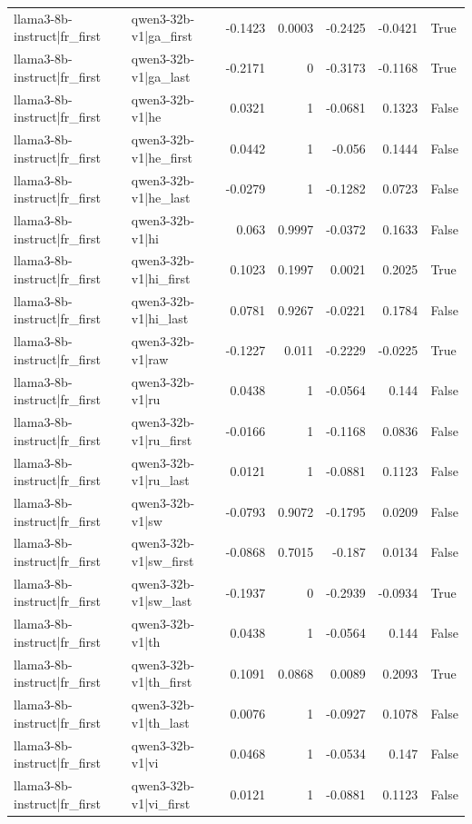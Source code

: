 \begin{table}
\begin{tabular}{l l r r r r l}
llama3-8b-instruct|fr_first & qwen3-32b-v1|ga_first & -0.1423 & 0.0003 & -0.2425 & -0.0421 & True \\
llama3-8b-instruct|fr_first & qwen3-32b-v1|ga_last & -0.2171 & 0 & -0.3173 & -0.1168 & True \\
llama3-8b-instruct|fr_first & qwen3-32b-v1|he & 0.0321 & 1 & -0.0681 & 0.1323 & False \\
llama3-8b-instruct|fr_first & qwen3-32b-v1|he_first & 0.0442 & 1 & -0.056 & 0.1444 & False \\
llama3-8b-instruct|fr_first & qwen3-32b-v1|he_last & -0.0279 & 1 & -0.1282 & 0.0723 & False \\
llama3-8b-instruct|fr_first & qwen3-32b-v1|hi & 0.063 & 0.9997 & -0.0372 & 0.1633 & False \\
llama3-8b-instruct|fr_first & qwen3-32b-v1|hi_first & 0.1023 & 0.1997 & 0.0021 & 0.2025 & True \\
llama3-8b-instruct|fr_first & qwen3-32b-v1|hi_last & 0.0781 & 0.9267 & -0.0221 & 0.1784 & False \\
llama3-8b-instruct|fr_first & qwen3-32b-v1|raw & -0.1227 & 0.011 & -0.2229 & -0.0225 & True \\
llama3-8b-instruct|fr_first & qwen3-32b-v1|ru & 0.0438 & 1 & -0.0564 & 0.144 & False \\
llama3-8b-instruct|fr_first & qwen3-32b-v1|ru_first & -0.0166 & 1 & -0.1168 & 0.0836 & False \\
llama3-8b-instruct|fr_first & qwen3-32b-v1|ru_last & 0.0121 & 1 & -0.0881 & 0.1123 & False \\
llama3-8b-instruct|fr_first & qwen3-32b-v1|sw & -0.0793 & 0.9072 & -0.1795 & 0.0209 & False \\
llama3-8b-instruct|fr_first & qwen3-32b-v1|sw_first & -0.0868 & 0.7015 & -0.187 & 0.0134 & False \\
llama3-8b-instruct|fr_first & qwen3-32b-v1|sw_last & -0.1937 & 0 & -0.2939 & -0.0934 & True \\
llama3-8b-instruct|fr_first & qwen3-32b-v1|th & 0.0438 & 1 & -0.0564 & 0.144 & False \\
llama3-8b-instruct|fr_first & qwen3-32b-v1|th_first & 0.1091 & 0.0868 & 0.0089 & 0.2093 & True \\
llama3-8b-instruct|fr_first & qwen3-32b-v1|th_last & 0.0076 & 1 & -0.0927 & 0.1078 & False \\
llama3-8b-instruct|fr_first & qwen3-32b-v1|vi & 0.0468 & 1 & -0.0534 & 0.147 & False \\
llama3-8b-instruct|fr_first & qwen3-32b-v1|vi_first & 0.0121 & 1 & -0.0881 & 0.1123 & False \\

\end{tabular}
\end{table}
